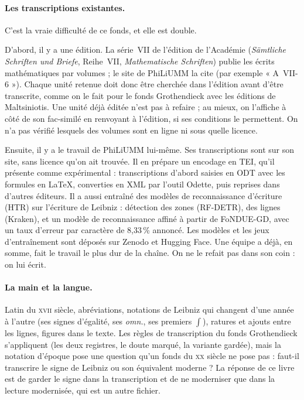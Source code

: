 \paragraph{Les transcriptions existantes.} C'est la vraie difficulté de ce fonds, et elle
est double.

D'abord, il y a une édition. La série~VII de l'édition de l'Académie (\emph{Sämtliche
Schriften und Briefe}, Reihe~VII, \emph{Mathematische Schriften}) publie les écrits
mathématiques par volumes ; le site de PhiLiUMM la cite (par exemple « A~VII-6 »). Chaque
unité retenue doit donc être cherchée dans l'édition avant d'être transcrite, comme on le
fait pour le fonds Grothendieck avec les éditions de Maltsiniotis. Une unité déjà éditée
n'est pas à refaire ; au mieux, on l'affiche à côté de son fac-similé en renvoyant à
l'édition, si ses conditions le permettent. On n'a pas vérifié lesquels des volumes sont
en ligne ni sous quelle licence.

Ensuite, il y a le travail de PhiLiUMM lui-même. Ses transcriptions sont sur son site, sans
licence qu'on ait trouvée. Il en prépare un encodage en TEI, qu'il présente comme
expérimental : transcriptions d'abord saisies en ODT avec les formules en LaTeX,
converties en XML par l'outil Odette, puis reprises dans d'autres éditeurs. Il a aussi
entraîné des modèles de reconnaissance d'écriture (HTR) sur l'écriture de Leibniz :
détection des zones (RF-DETR), des lignes (Kraken), et un modèle de reconnaissance affiné
à partir de FoNDUE-GD, avec un taux d'erreur par caractère de 8,33\,\% annoncé. Les modèles
et les jeux d'entraînement sont déposés sur Zenodo et Hugging Face. Une équipe a déjà, en
somme, fait le travail le plus dur de la chaîne. On ne le refait pas dans son coin : on lui
écrit.

\paragraph{La main et la langue.} Latin du \textsc{xvii}\ieme{} siècle, abréviations,
notations de Leibniz qui changent d'une année à l'autre (ses signes d'égalité, ses
\emph{omn.}, ses premiers $\int$), ratures et ajouts entre les lignes, figures dans le
texte. Les règles de transcription du fonds Grothendieck s'appliquent (les deux registres,
le doute marqué, la variante gardée), mais la notation d'époque pose une question qu'un
fonds du \textsc{xx}\ieme{} siècle ne pose pas : faut-il transcrire le signe de Leibniz ou
son équivalent moderne ? La réponse de ce livre est de garder le signe dans la
transcription et de ne moderniser que dans la lecture modernisée, qui est un autre
fichier.

